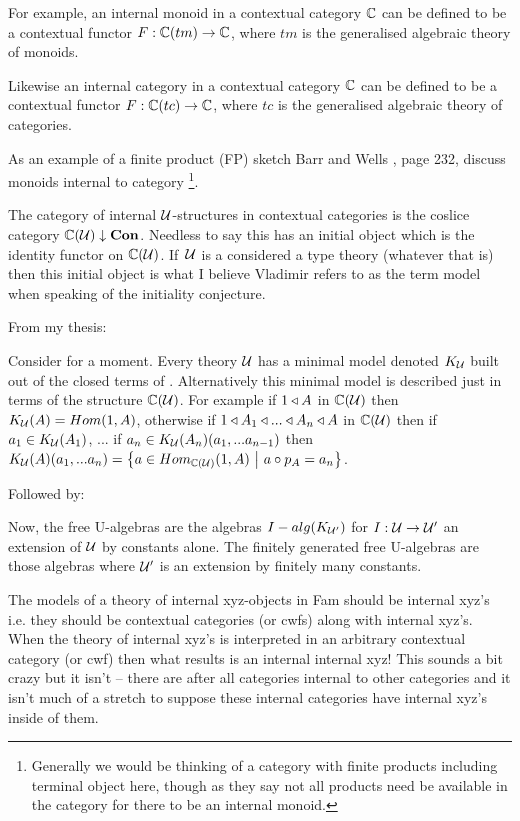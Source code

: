 \note
For example, an internal monoid in a contextual category $\ccat[C]$
can be defined to be a contextual functor $F: \ccat[C](tm) \morph  \ccat[C]$, where $tm$ is the generalised algebraic theory of monoids.


\note 
Likewise an internal category in a contextual category $\ccat[C]$
can be defined to be a contextual functor $F: \ccat[C](tc) \morph  \ccat[C]$, where $tc$ is the generalised algebraic theory of categories.



\note
As an example of a finite product (FP) sketch Barr and Wells \cite{BarrandWells}, page 232, discuss monoids internal to  category
\footnote{Generally we would be thinking of a category with finite products including terminal object here, though as they say not all products need be available in the category for there to be an internal monoid.}.

\note The category of internal $\gat[U]$-structures in contextual categories is the coslice category
$\CofU \downarrow \catCon$. Needless to say this has an initial object which is the identity functor on  $\CofU$.
If\ $\gat[U]$ is a considered a type theory (whatever that is) then this initial object is what I believe Vladimir refers
to as the term model when speaking of the initiality conjecture.

\note From my thesis:
\begin{tightquote}
Consider for a moment. Every theory $\gat[U]$ has a minimal model denoted $\KU$ built out of the closed terms of \gat[U]. Alternatively this minimal model is described just in terms of the structure $\CofU$. For example
if $1 \base A$ in $\CofU$ then 
$\KU(A)=Hom(1,A)$, otherwise if $1 \base A_1 \base ... \base A_n \base A$ in $\CofU$
then if $a_1 \in \KU(A_1)$, ... if $a_n \in \KU(A_n)(a_1,...a_{n-1})$ then 
$\KU(A)(a_1,...a_n)=\setsuchthat{a\in Hom_{\CofU}(1,A)}{a \circ p_A = a_n}$. \\
\end{tightquote} 

Followed by:
\begin{tightquote}
Now, the free U-algebras are the algebras $I-alg(\KUp)$ for $I: \gat[U] \morph \gat[U']$ an extension of $\gat[U]$ by constants alone. The finitely generated free U-algebras are those algebras where $\gat[U']$ is an extension by finitely many constants. \\
\end{tightquote}

\note
The models of a theory of internal xyz-objects  in Fam should be  internal xyz's i.e. they should be contextual categories (or cwfs) along with internal xyz's. When the theory of internal xyz's is interpreted in an arbitrary contextual category (or cwf) then what results is an internal internal xyz! This sounds a bit crazy but it isn't -- there are after all categories internal to other categories and it isn't much of a stretch to suppose these internal categories have internal xyz's inside of them. 

